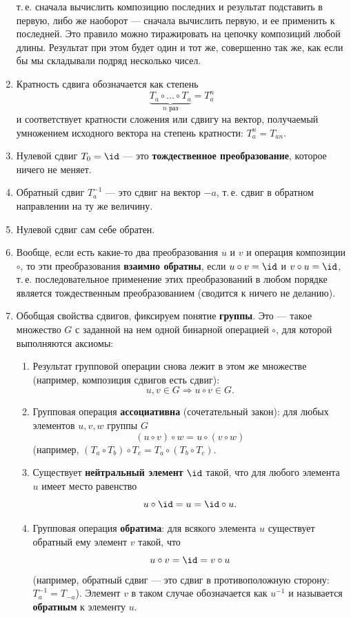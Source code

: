 \begin{enumerate}
$$$$
т.\,е. сначала вычислить композицию последних и результат подставить в первую, либо же наоборот --- сначала вычислить первую, и ее применить к последней. Это правило можно тиражировать на цепочку композиций любой длины. Результат при этом будет один и тот же, совершенно так же, как если бы мы складывали подряд несколько чисел.
\item Кратность сдвига обозначается как степень
$$
\underbrace{T_a\circ\dots\circ T_a}_{n\mbox{ раз}}=T_a^n
$$
и соответствует кратности сложения или сдвигу на вектор, получаемый умножением исходного вектора на степень кратности: $T_a^n=T_{an}$.
\item Нулевой сдвиг $T_0=\id$ --- это \textbf{тождественное преобразование}, которое ничего не меняет.
\item Обратный сдвиг $T_a^{-1}$ --- это сдвиг на вектор $-a$, т.\,е. сдвиг в обратном направлении на ту же величину.
\item Нулевой сдвиг сам себе обратен.
\item Вообще, если есть какие-то два преобразования $u$ и $v$ и операция композиции $\circ$, то эти преобразования \textbf{взаимно обратны}, если $u\circ v=\id$ и $v\circ u=\id$, т.\,е. последовательное применение этих преобразований в любом порядке является тождественным преобразованием (сводится к ничего не деланию).
\item Обобщая свойства сдвигов, фиксируем понятие \textbf{группы}. Это --- такое множество $G$ с заданной на нем одной бинарной операцией $\circ$, для которой выполняются аксиомы:
\begin{enumerate}[{\bf G}1)]
\item Результат групповой операции снова лежит в этом же множестве (например, композиция сдвигов есть сдвиг):
$$
u,v\in G \Rightarrow u\circ v\in G.
$$
\item Групповая операция \textbf{ассоциативна} (сочетательный закон): для любых элементов $u,v,w$ группы $G$
$$
(u\circ v)\circ w = u\circ (v\circ w)
$$
(например, $(T_a\circ T_b)\circ T_c=T_a\circ(T_b\circ T_c)$.
\item Существует \textbf{нейтральный элемент} $\id$ такой, что для любого элемента $u$ имеет место равенство
$$
u\circ\id = u = \id\circ u.
$$
\item Групповая операция \textbf{обратима}: для всякого элемента $u$ существует обратный ему элемент $v$ такой, что
$$
u\circ v=\id = v\circ u
$$
(например, обратный сдвиг --- это сдвиг в противоположную сторону:  $T_{a}^{-1}=T_{-a}$). Элемент $v$ в таком случае обозначается как $u^{-1}$ и называется \textbf{обратным} к элементу $u$.

\end{enumerate}
\end{enumerate}
